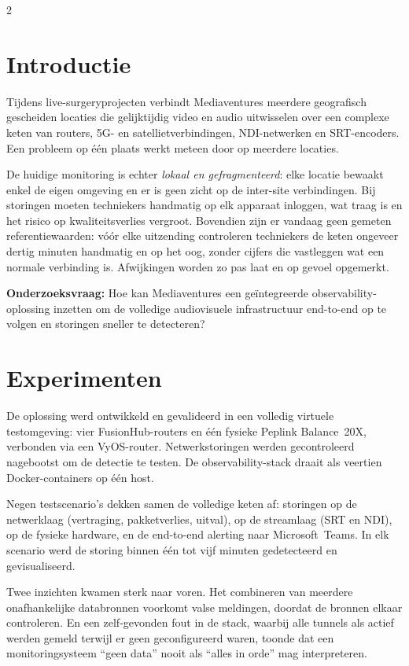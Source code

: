 \documentclass[a0,portrait]{hogent-poster}
\begin{document}
\begin{multicols}{2} %

\section{Introductie}

Tijdens live-surgeryprojecten verbindt Mediaventures meerdere geografisch gescheiden locaties die gelijktijdig video en audio uitwisselen over een complexe keten van routers, 5G- en satellietverbindingen, NDI-netwerken en SRT-encoders. Een probleem op \'e\'en plaats werkt meteen door op meerdere locaties.

De huidige monitoring is echter \emph{lokaal en gefragmenteerd}: elke locatie bewaakt enkel de eigen omgeving en er is geen zicht op de inter-site verbindingen. Bij storingen moeten techniekers handmatig op elk apparaat inloggen, wat traag is en het risico op kwaliteitsverlies vergroot. Bovendien zijn er vandaag geen gemeten referentiewaarden: v\'o\'or elke uitzending controleren techniekers de keten ongeveer dertig minuten handmatig en op het oog, zonder cijfers die vastleggen wat een normale verbinding is. Afwijkingen worden zo pas laat en op gevoel opgemerkt.

\textbf{Onderzoeksvraag:} Hoe kan Mediaventures een ge\"integreerde observability-oplossing inzetten om de volledige audiovisuele infrastructuur end-to-end op te volgen en storingen sneller te detecteren?

\section{Experimenten}

De oplossing werd ontwikkeld en gevalideerd in een volledig virtuele testomgeving: vier FusionHub-routers en \'e\'en fysieke Peplink Balance~20X, verbonden via een VyOS-router. Netwerkstoringen werden gecontroleerd nagebootst om de detectie te testen. De observability-stack draait als veertien Docker-containers op \'e\'en host.

Negen testscenario's dekken samen de volledige keten af: storingen op de netwerklaag (vertraging, pakketverlies, uitval), op de streamlaag (SRT en NDI), op de fysieke hardware, en de end-to-end alerting naar Microsoft~Teams. In elk scenario werd de storing binnen \'e\'en tot vijf minuten gedetecteerd en gevisualiseerd.

Twee inzichten kwamen sterk naar voren. Het combineren van meerdere onafhankelijke databronnen voorkomt valse meldingen, doordat de bronnen elkaar controleren. En een zelf-gevonden fout in de stack, waarbij alle tunnels als actief werden gemeld terwijl er geen geconfigureerd waren, toonde dat een monitoringsysteem ``geen data'' nooit als ``alles in orde'' mag interpreteren.


\end{multicols}
\end{document}

